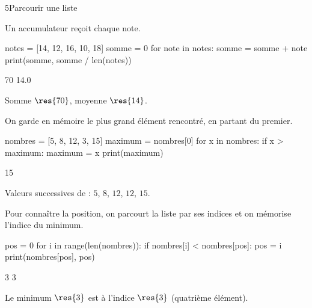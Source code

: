 \begin{corrige}{5}{Parcourir une liste}
\begin{questions}
  \item Un accumulateur reçoit chaque note.
\begin{codecote}[0.56]
\begin{pythoncol}
notes = [14, 12, 16, 10, 18]
somme = 0
for note in notes:
    somme = somme + note
print(somme, somme / len(notes))
\end{pythoncol}
\cote
\begin{consolecol}
70 14.0
\end{consolecol}

\medskip
Somme $\res{70}$, moyenne $\res{14}$.
\end{codecote}
  \item On garde en mémoire le plus grand élément rencontré, en partant du premier.
\begin{codecote}[0.56]
\begin{pythoncol}
nombres = [5, 8, 12, 3, 15]
maximum = nombres[0]
for x in nombres:
    if x > maximum:
        maximum = x
print(maximum)
\end{pythoncol}
\cote
\begin{consolecol}
15
\end{consolecol}

\medskip
Valeurs successives de  : $5$, $8$, $12$, $12$, $15$.
\end{codecote}
  \item Pour connaître la position, on parcourt la liste par ses indices et on mémorise l'indice du minimum.
\begin{codecote}[0.56]
\begin{pythoncol}
pos = 0
for i in range(len(nombres)):
    if nombres[i] < nombres[pos]:
        pos = i
print(nombres[pos], pos)
\end{pythoncol}
\cote
\begin{consolecol}
3 3
\end{consolecol}

\medskip
Le minimum $\res{3}$ est à l'indice $\res{3}$ (quatrième élément).
\end{codecote}
\end{questions}
\end{corrige}

